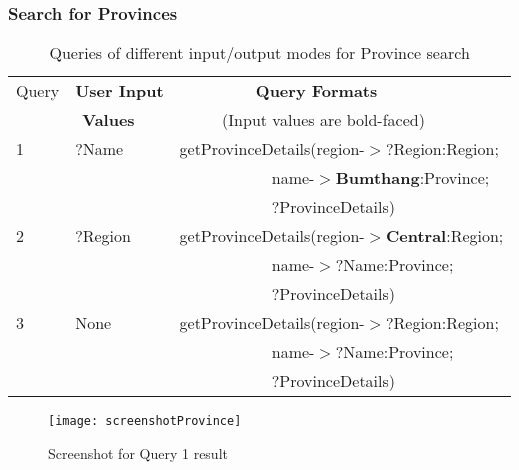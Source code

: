 \subsubsection{Search for Provinces}
\begin{table} [tbph]
\caption{Queries of different input/output modes for Province search}
\centering
\footnotesize
\begin{tabular}{|l|l|l|}
\hline
 Query&\textbf{User Input} &$~~~~~~~~~~~~~~~~~~~~$ \textbf{Query Formats} \\
 &$~~$\textbf{Values}   &$~~~~~~~~~~~~$(Input values are bold-faced)              \\
\hline
 1&$?$Name & getProvinceDetails(region-$>?$Region:Region;\\
  &        &$~~~~~~~~~~~~~~~~~~~~~~~~~~$name-$>$\textbf{Bumthang}:Province; \\
  &       &$~~~~~~~~~~~~~~~~~~~~~~~~~~?$ProvinceDetails)\\
          
 \hline
 2&$?$Region & getProvinceDetails(region-$>$\textbf{Central}:Region;\\
  &        &$~~~~~~~~~~~~~~~~~~~~~~~~~~$name-$>$?Name:Province; \\
  &        &$~~~~~~~~~~~~~~~~~~~~~~~~~~?$ProvinceDetails)\\
 \hline
 3&None & getProvinceDetails(region-$>?$Region:Region;\\
  &        &$~~~~~~~~~~~~~~~~~~~~~~~~~~$name-$>$?Name:Province; \\
  &        &$~~~~~~~~~~~~~~~~~~~~~~~~~~?$ProvinceDetails)\\         
\hline
\end{tabular} 
\end{table}


\begin{figure}
\texttt{[image: screenshotProvince]}
\caption {Screenshot for Query 1 result}
\label{fig:Fig6.2}
\end{figure}


